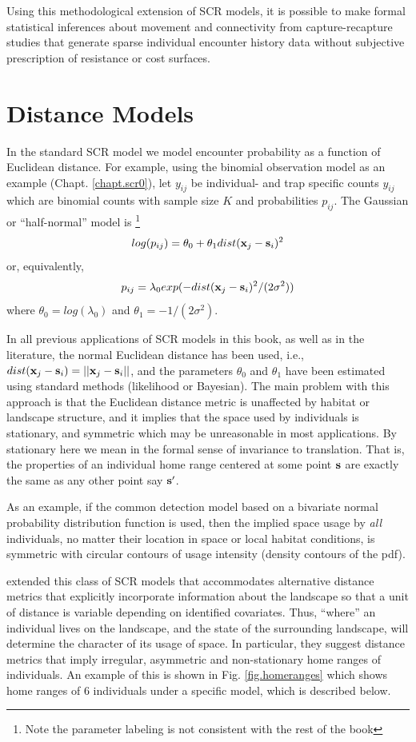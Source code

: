 Using this methodological extension of SCR models, it is possible to
make formal statistical inferences 
about movement and connectivity from 
capture-recapture studies that generate sparse individual encounter
history data without subjective prescription of resistance
or cost surfaces.


\section{Distance Models}


In the standard SCR model we model encounter probability as a function
of Euclidean distance. For example, using the binomial observation model
as an example (Chapt. \ref{chapt.scr0}), let 
$y_{ij}$ be individual- and trap specific counts $y_{ij}$
which are binomial counts with sample size $K$ and probabilities
$p_{ij}$. The Gaussian or ``half-normal'' model is \footnote{Note the
  parameter labeling is not consistent with the rest of the book}
\[
log(p_{ij})= \theta_{0} + \theta_{1} dist({\bf x}_{j} - {\bf s}_{i})^{2}
\]
or, equivalently, 
\[
p_{ij} = \lambda_{0} exp(-  dist({\bf x}_{j} - {\bf s}_{i})^{2}
/(2\sigma^{2}) )
\]
where $\theta_{0} = log(\lambda_{0})$ and $\theta_{1} =
-1/(2\sigma^2)$. 


In all previous applications of SCR models in this book, as well as in
the literature, the normal Euclidean distance has been used, i.e., $
dist({\bf x}_{j} - {\bf s}_{i}) = ||{\bf x}_{j} - {\bf s}_{i}||$, and
the parameters $\theta_0$ and $\theta_1$ have been estimated using
standard methods (likelihood or Bayesian).  The main problem with this
approach is that the Euclidean distance metric is unaffected by
habitat or landscape structure, and it implies that the space used by
individuals is stationary, and symmetric which may be unreasonable in
most applications. By stationary here we mean in the formal sense of
invariance to translation. That is, the properties of an individual
home range centered at some point ${\bf s}$ are exactly the same as
any other point say ${\bf s}'$.

As an example, if the common detection model based on a bivariate
normal probability distribution function is used, then the implied
space usage by {\it all} individuals, no matter their location in
space or local habitat conditions, is symmetric with circular contours
of usage intensity (density contours of the pdf).

\citet{royle_etal:2012ecol} extended this class of SCR models that
accommodates alternative distance metrics that explicitly incorporate
information about the landscape so that a unit of distance is variable
depending on identified covariates.  Thus, ``where'' an individual
lives on the landscape, and the state of the surrounding landscape,
will determine the character of its usage of space. In particular, they
suggest distance metrics that imply irregular, asymmetric and
non-stationary home ranges of individuals. An example of this is shown
in Fig. \ref{fig.homeranges} which shows home ranges of 6 individuals
under a specific model, which is described below.


